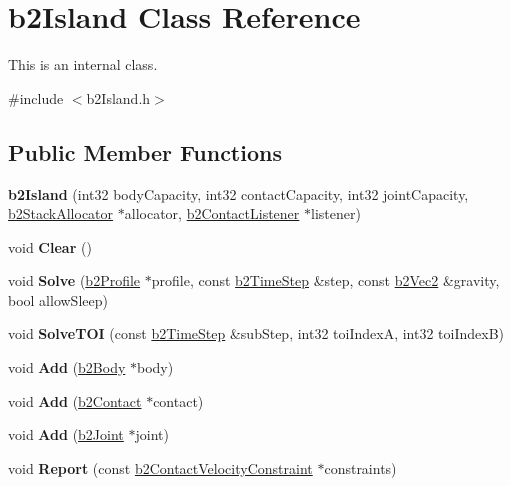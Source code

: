 \hypertarget{classb2_island}{}\section{b2\+Island Class Reference}
\label{classb2_island}


This is an internal class.  




{\ttfamily \#include $<$b2\+Island.\+h$>$}

\subsection*{Public Member Functions}
\begin{DoxyCompactItemize}
\item 
\mbox{\label{classb2_island_a2f2258f09d2663dcb35a1d69d16896cb}} 
{\bfseries b2\+Island} (int32 body\+Capacity, int32 contact\+Capacity, int32 joint\+Capacity, \hyperlink{classb2_stack_allocator}{b2\+Stack\+Allocator} $\ast$allocator, \hyperlink{classb2_contact_listener}{b2\+Contact\+Listener} $\ast$listener)
\item 
\mbox{\label{classb2_island_a26566f7388fcaf7523446e5e76d99c4d}} 
void {\bfseries Clear} ()
\item 
\mbox{\label{classb2_island_a28a6f74174cde3a6e93663c740f418fa}} 
void {\bfseries Solve} (\hyperlink{structb2_profile}{b2\+Profile} $\ast$profile, const \hyperlink{structb2_time_step}{b2\+Time\+Step} \&step, const \hyperlink{structb2_vec2}{b2\+Vec2} \&gravity, bool allow\+Sleep)
\item 
\mbox{\label{classb2_island_a61f577b473962bb0d8add1f55eeef7ee}} 
void {\bfseries Solve\+T\+OI} (const \hyperlink{structb2_time_step}{b2\+Time\+Step} \&sub\+Step, int32 toi\+IndexA, int32 toi\+IndexB)
\item 
\mbox{\label{classb2_island_af2d54861bd063051c0a6dc5f73b27c3e}} 
void {\bfseries Add} (\hyperlink{classb2_body}{b2\+Body} $\ast$body)
\item 
\mbox{\label{classb2_island_abc0ea9208e818b551404fd507f197a51}} 
void {\bfseries Add} (\hyperlink{classb2_contact}{b2\+Contact} $\ast$contact)
\item 
\mbox{\label{classb2_island_a04e6ccd0c11f6ef5a7ed0a926d081445}} 
void {\bfseries Add} (\hyperlink{classb2_joint}{b2\+Joint} $\ast$joint)
\item 
\mbox{\label{classb2_island_a57620f76faf000f61c76e925e40e6129}} 
void {\bfseries Report} (const \hyperlink{structb2_contact_velocity_constraint}{b2\+Contact\+Velocity\+Constraint} $\ast$constraints)
\end{DoxyCompactItemize}
